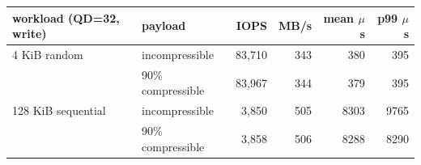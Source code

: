 \begin{tabular}{llrrrr}
\toprule
workload (QD=32, write) & payload & IOPS & MB/s & mean $\mu$s & p99 $\mu$s \\
\midrule
4 KiB random & incompressible & 83,710 & 343 & 380 & 395 \\
 & 90\% compressible & 83,967 & 344 & 379 & 395 \\
128 KiB sequential & incompressible & 3,850 & 505 & 8303 & 9765 \\
 & 90\% compressible & 3,858 & 506 & 8288 & 8290 \\
\bottomrule
\end{tabular}
